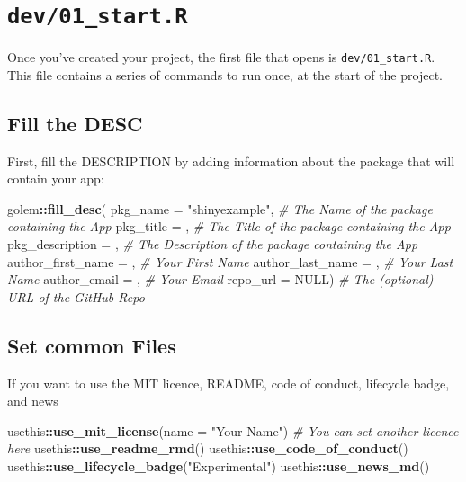 \documentclass[]{book}
\newenvironment{Shaded}{\begin{snugshade}}{\end{snugshade}}
\newcommand{\CommentTok}[1]{\textcolor[rgb]{0.56,0.35,0.01}{\textit{#1}}}
\newcommand{\DataTypeTok}[1]{\textcolor[rgb]{0.13,0.29,0.53}{#1}}
\newcommand{\KeywordTok}[1]{\textcolor[rgb]{0.13,0.29,0.53}{\textbf{#1}}}
\newcommand{\NormalTok}[1]{#1}
\newcommand{\OperatorTok}[1]{\textcolor[rgb]{0.81,0.36,0.00}{\textbf{#1}}}
\newcommand{\OtherTok}[1]{\textcolor[rgb]{0.56,0.35,0.01}{#1}}
\newcommand{\StringTok}[1]{\textcolor[rgb]{0.31,0.60,0.02}{#1}}
\begin{document}
\hypertarget{dev01_start.r}{%
\section{\texorpdfstring{\texttt{dev/01\_start.R}}{dev/01\_start.R}}\label{dev01_start.r}}

Once you've created your project, the first file that opens is \texttt{dev/01\_start.R}. This file contains a series of commands to run once, at the start of the project.

\hypertarget{fill-the-desc}{%
\subsection{Fill the DESC}\label{fill-the-desc}}

First, fill the DESCRIPTION by adding information about the package that will contain your app:

\begin{Shaded}
\begin{Highlighting}[]
\NormalTok{golem}\OperatorTok{::}\KeywordTok{fill_desc}\NormalTok{(}
  \DataTypeTok{pkg_name =} \StringTok{"shinyexample"}\NormalTok{, }\CommentTok{# The Name of the package containing the App }
  \DataTypeTok{pkg_title =}\NormalTok{ , }\CommentTok{# The Title of the package containing the App }
  \DataTypeTok{pkg_description =}\NormalTok{ , }\CommentTok{# The Description of the package containing the App }
  \DataTypeTok{author_first_name =}\NormalTok{ , }\CommentTok{# Your First Name}
  \DataTypeTok{author_last_name =}\NormalTok{ ,  }\CommentTok{# Your Last Name}
  \DataTypeTok{author_email =}\NormalTok{ ,      }\CommentTok{# Your Email}
  \DataTypeTok{repo_url =} \OtherTok{NULL}\NormalTok{)      }\CommentTok{# The (optional) URL of the GitHub Repo}
\end{Highlighting}
\end{Shaded}

\hypertarget{set-common-files}{%
\subsection{Set common Files}\label{set-common-files}}

If you want to use the MIT licence, README, code of conduct, lifecycle badge, and news

\begin{Shaded}
\begin{Highlighting}[]
\NormalTok{usethis}\OperatorTok{::}\KeywordTok{use_mit_license}\NormalTok{(}\DataTypeTok{name =} \StringTok{"Your Name"}\NormalTok{)  }\CommentTok{# You can set another licence here}
\NormalTok{usethis}\OperatorTok{::}\KeywordTok{use_readme_rmd}\NormalTok{()}
\NormalTok{usethis}\OperatorTok{::}\KeywordTok{use_code_of_conduct}\NormalTok{()}
\NormalTok{usethis}\OperatorTok{::}\KeywordTok{use_lifecycle_badge}\NormalTok{(}\StringTok{"Experimental"}\NormalTok{)}
\NormalTok{usethis}\OperatorTok{::}\KeywordTok{use_news_md}\NormalTok{()}
\end{Highlighting}
\end{Shaded}
\end{document}
